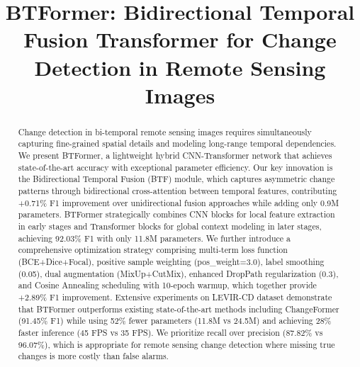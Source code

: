 \documentclass[journal]{IEEEtran}
\begin{document}
\title{BTFormer: Bidirectional Temporal Fusion Transformer for Change Detection in Remote Sensing Images}

\author{
\and
{}
}

\maketitle

\begin{abstract}
Change detection in bi-temporal remote sensing images requires simultaneously capturing fine-grained spatial details and modeling long-range temporal dependencies. We present BTFormer, a lightweight hybrid CNN-Transformer network that achieves state-of-the-art accuracy with exceptional parameter efficiency. Our key innovation is the Bidirectional Temporal Fusion (BTF) module, which captures asymmetric change patterns through bidirectional cross-attention between temporal features, contributing +0.71\% F1 improvement over unidirectional fusion approaches while adding only 0.9M parameters. BTFormer strategically combines CNN blocks for local feature extraction in early stages and Transformer blocks for global context modeling in later stages, achieving 92.03\% F1 with only 11.8M parameters. We further introduce a comprehensive optimization strategy comprising multi-term loss function (BCE+Dice+Focal), positive sample weighting (pos\_weight=3.0), label smoothing (0.05), dual augmentation (MixUp+CutMix), enhanced DropPath regularization (0.3), and Cosine Annealing scheduling with 10-epoch warmup, which together provide +2.89\% F1 improvement. Extensive experiments on LEVIR-CD dataset demonstrate that BTFormer outperforms existing state-of-the-art methods including ChangeFormer (91.45\% F1) while using 52\% fewer parameters (11.8M vs 24.5M) and achieving 28\% faster inference (45 FPS vs 35 FPS). We prioritize recall over precision (87.82\% vs 96.07\%), which is appropriate for remote sensing change detection where missing true changes is more costly than false alarms.
\end{abstract}
\end{document}
